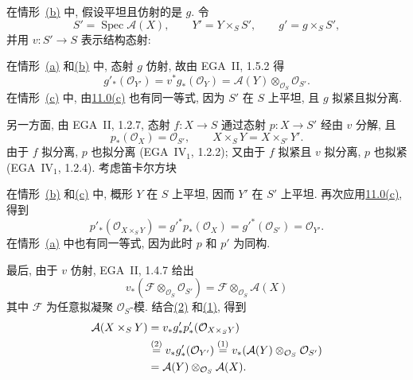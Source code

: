 在情形~\hyperref[concl:sga3-VIB-11.1-b]{\textup{(b)}} 中,
假设平坦且仿射的是 \(g\). 令
\[
  S'=\operatorname{Spec}\mathcal A(X),\qquad
  Y'=Y\times_SS',\qquad
  g'=g\times_SS',
\]
并用 \(v:S'\to S\) 表示结构态射:
\begin{center}
  \label{diag:sga3-VIB-11.1-base-change}%
\end{center}
在情形~\hyperref[concl:sga3-VIB-11.1-a]{\textup{(a)}}
和\hyperref[concl:sga3-VIB-11.1-b]{\textup{(b)}} 中, 态射 \(g\) 仿射,
故由 EGA~II, 1.5.2 得
\label{form:sga3-VIB-11.1-eq1}%
\[
  \tag{1}
  g'_*(\mathcal O_{Y'})
    =v^*g_*(\mathcal O_Y)
    =\mathcal A(Y)\otimes_{\mathcal O_S}\mathcal O_{S'}.
\]
在情形~\hyperref[concl:sga3-VIB-11.1-c]{\textup{(c)}} 中,
由\hyperref[concl:sga3-VIB-11.0-c]{11.0\textup{(c)}} 也有同一等式,
因为 \(S'\) 在 \(S\) 上平坦, 且 \(g\) 拟紧且拟分离.

另一方面, 由 EGA~II, 1.2.7, 态射 \(f:X\to S\)
通过态射 \(p:X\to S'\) 经由 \(v\) 分解, 且
\[
  p_*(\mathcal O_X)=\mathcal O_{S'},
  \qquad
  X\times_SY=X\times_{S'}Y'.
\]
由于 \(f\) 拟分离, \(p\) 也拟分离
\textup{(EGA~IV\(_1\), 1.2.2)};
又由于 \(f\) 拟紧且 \(v\) 拟分离, \(p\) 也拟紧
\textup{(EGA~IV\(_1\), 1.2.4)}. 考虑笛卡尔方块
\begin{center}
  \label{diag:sga3-VIB-11.1-cartesian}%
\end{center}
在情形~\hyperref[concl:sga3-VIB-11.1-b]{\textup{(b)}}
和\hyperref[concl:sga3-VIB-11.1-c]{\textup{(c)}} 中,
概形 \(Y\) 在 \(S\) 上平坦, 因而 \(Y'\) 在 \(S'\) 上平坦.
再次应用\hyperref[concl:sga3-VIB-11.0-c]{11.0\textup{(c)}}, 得到
\label{form:sga3-VIB-11.1-eq2}%
\[
  \tag{2}
  p'_*(\mathcal O_{X\times_SY})
    =g'^*p_*(\mathcal O_X)
    =g'^*(\mathcal O_{S'})
    =\mathcal O_{Y'}.
\]
在情形~\hyperref[concl:sga3-VIB-11.1-a]{\textup{(a)}} 中也有同一等式,
因为此时 \(p\) 和 \(p'\) 为同构.

最后, 由于 \(v\) 仿射, EGA~II, 1.4.7 给出
\[
  v_*(\mathcal F\otimes_{\mathcal O_S}\mathcal O_{S'})
    =\mathcal F\otimes_{\mathcal O_S}\mathcal A(X)
\]
其中 \(\mathcal F\) 为任意拟凝聚 \(\mathcal O_S\)-模.
结合\hyperref[form:sga3-VIB-11.1-eq2]{\textup{(2)}}
和\hyperref[form:sga3-VIB-11.1-eq1]{\textup{(1)}}, 得到
\[
\begin{aligned}
  \mathcal A(X\times_SY)
    &=v_*g'_*p'_*(\mathcal O_{X\times_SY})\\
    &\overset{\textup{(2)}}{=}v_*g'_*(\mathcal O_{Y'})
     \overset{\textup{(1)}}{=}
       v_*(\mathcal A(Y)\otimes_{\mathcal O_S}\mathcal O_{S'})\\
    &=\mathcal A(Y)\otimes_{\mathcal O_S}\mathcal A(X).
\end{aligned}
\]

